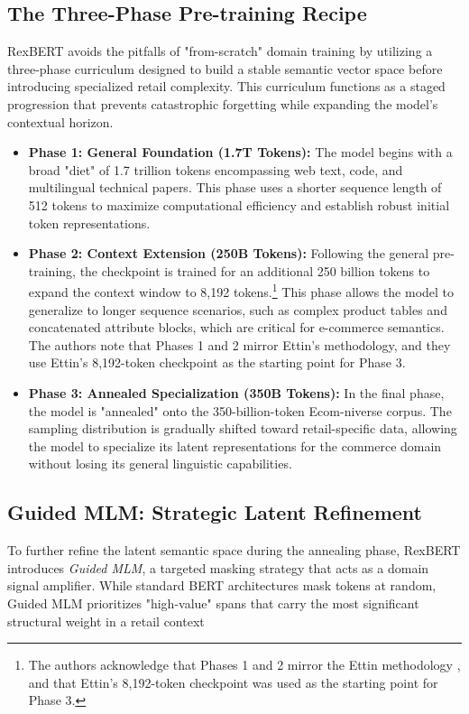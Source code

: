 \documentclass[a4paper,12pt]{article}
\begin{document}
\subsection{The Three-Phase Pre-training Recipe}
RexBERT avoids the pitfalls of "from-scratch" domain training by utilizing a three-phase curriculum designed to build a stable semantic vector space before introducing specialized retail complexity. This curriculum functions as a staged progression that prevents catastrophic forgetting while expanding the model's contextual horizon.

\begin{itemize}
    \item \textbf{Phase 1: General Foundation (1.7T Tokens):} The model begins with a broad "diet" of 1.7 trillion tokens encompassing web text, code, and multilingual technical papers. This phase uses a shorter sequence length of 512 tokens to maximize computational efficiency and establish robust initial token representations.
    \item \textbf{Phase 2: Context Extension (250B Tokens):} Following the general pre-training, the checkpoint is trained for an additional 250 billion tokens to expand the context window to 8,192 tokens.\footnote{The authors acknowledge that Phases 1 and 2 mirror the Ettin methodology \citep{weller2025seq}, and that Ettin's 8,192-token checkpoint was used as the starting point for Phase 3.} This phase allows the model to generalize to longer sequence scenarios, such as complex product tables and concatenated attribute blocks, which are critical for e-commerce semantics. The authors note that Phases 1 and 2 mirror Ettin's methodology, and they use Ettin's 8,192-token checkpoint as the starting point for Phase 3.
    \item \textbf{Phase 3: Annealed Specialization (350B Tokens):} In the final phase, the model is "annealed" onto the 350-billion-token Ecom-niverse corpus. The sampling distribution is gradually shifted toward retail-specific data, allowing the model to specialize its latent representations for the commerce domain without losing its general linguistic capabilities.
\end{itemize}

\subsection{Guided MLM: Strategic Latent Refinement}
To further refine the latent semantic space during the annealing phase, RexBERT introduces \textit{Guided MLM}, a targeted masking strategy that acts as a domain signal amplifier. While standard BERT architectures mask tokens at random, Guided MLM prioritizes "high-value" spans that carry the most significant structural weight in a retail context
\end{document}
